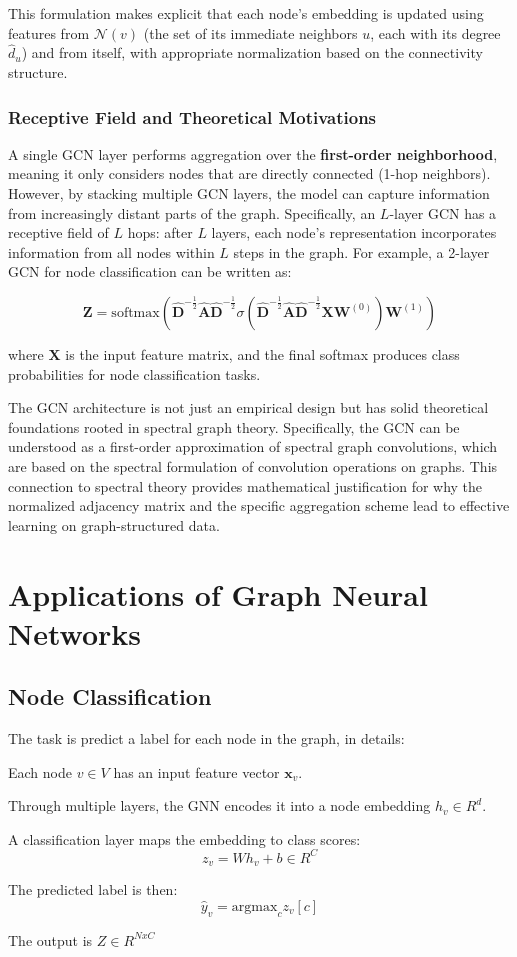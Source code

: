 This formulation makes explicit that each node's embedding is updated using features from $\mathcal{N}(v)$ (the set of its immediate neighbors $u$, each with its degree $\hat{d}_u$) and from itself, with appropriate normalization based on the connectivity structure.

\subsubsection{Receptive Field and Theoretical Motivations}
A single GCN layer performs aggregation over the \textbf{first-order neighborhood}, meaning it only considers nodes that are directly connected (1-hop neighbors). However, by stacking multiple GCN layers, the model can capture information from increasingly distant parts of the graph. Specifically, an $L$-layer GCN has a receptive field of $L$ hops: after $L$ layers, each node's representation incorporates information from all nodes within $L$ steps in the graph. For example, a 2-layer GCN for node classification can be written as:

$$\mathbf{Z} = \text{softmax}\left(\hat{\mathbf{D}}^{-\frac{1}{2}} \hat{\mathbf{A}} \hat{\mathbf{D}}^{-\frac{1}{2}} \sigma\left(\hat{\mathbf{D}}^{-\frac{1}{2}} \hat{\mathbf{A}} \hat{\mathbf{D}}^{-\frac{1}{2}} \mathbf{X} \mathbf{W}^{(0)}\right) \mathbf{W}^{(1)}\right)$$

where $\mathbf{X}$ is the input feature matrix, and the final softmax produces class probabilities for node classification tasks.

The GCN architecture is not just an empirical design but has solid theoretical foundations rooted in spectral graph theory. Specifically, the GCN can be understood as a first-order approximation of spectral graph convolutions, which are based on the spectral formulation of convolution operations on graphs. This connection to spectral theory provides mathematical justification for why the normalized adjacency matrix and the specific aggregation scheme lead to effective learning on graph-structured data.

\section{Applications of Graph Neural Networks}

\subsection{Node Classification}
The task is predict a label for each node in the graph, in details:
\begin{compactitemize}
    \item Each node $v \in V$ has an input feature vector $\mathbf{x}_v$.
    \item Through multiple layers, the GNN encodes it into a node embedding $h_v \in R^d$.
    \item A classification layer maps the embedding to class scores:
    \[
        z_v = W h_v + b \in R^C
    \]
    \item The predicted label is then:
    \[
        \hat{y}_v = \text{argmax}_c z_{v}[c]
    \]
\end{compactitemize}
The output is $Z \in R^{NxC}$

